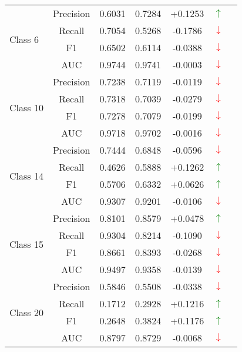\documentclass[12pt,a4paper]{article}
\begin{document}
\begin{longtable}{lcccccc}
\midrule
\multirow{4}{*}{Class 6} & Precision & 0.6031 & 0.7284 & +0.1253 & \textcolor{green}{$\uparrow$} \\
 & Recall & 0.7054 & 0.5268 & -0.1786 & \textcolor{red}{$\downarrow$} \\
 & F1 & 0.6502 & 0.6114 & -0.0388 & \textcolor{red}{$\downarrow$} \\
 & AUC & 0.9744 & 0.9741 & -0.0003 & \textcolor{red}{$\downarrow$} \\
\midrule
\multirow{4}{*}{Class 10} & Precision & 0.7238 & 0.7119 & -0.0119 & \textcolor{red}{$\downarrow$} \\
 & Recall & 0.7318 & 0.7039 & -0.0279 & \textcolor{red}{$\downarrow$} \\
 & F1 & 0.7278 & 0.7079 & -0.0199 & \textcolor{red}{$\downarrow$} \\
 & AUC & 0.9718 & 0.9702 & -0.0016 & \textcolor{red}{$\downarrow$} \\
\midrule
\multirow{4}{*}{Class 14} & Precision & 0.7444 & 0.6848 & -0.0596 & \textcolor{red}{$\downarrow$} \\
 & Recall & 0.4626 & 0.5888 & +0.1262 & \textcolor{green}{$\uparrow$} \\
 & F1 & 0.5706 & 0.6332 & +0.0626 & \textcolor{green}{$\uparrow$} \\
 & AUC & 0.9307 & 0.9201 & -0.0106 & \textcolor{red}{$\downarrow$} \\
\midrule
\multirow{4}{*}{Class 15} & Precision & 0.8101 & 0.8579 & +0.0478 & \textcolor{green}{$\uparrow$} \\
 & Recall & 0.9304 & 0.8214 & -0.1090 & \textcolor{red}{$\downarrow$} \\
 & F1 & 0.8661 & 0.8393 & -0.0268 & \textcolor{red}{$\downarrow$} \\
 & AUC & 0.9497 & 0.9358 & -0.0139 & \textcolor{red}{$\downarrow$} \\
\midrule
\multirow{4}{*}{Class 20} & Precision & 0.5846 & 0.5508 & -0.0338 & \textcolor{red}{$\downarrow$} \\
 & Recall & 0.1712 & 0.2928 & +0.1216 & \textcolor{green}{$\uparrow$} \\
 & F1 & 0.2648 & 0.3824 & +0.1176 & \textcolor{green}{$\uparrow$} \\
 & AUC & 0.8797 & 0.8729 & -0.0068 & \textcolor{red}{$\downarrow$} \\
\bottomrule
\end{longtable}
\end{document}
